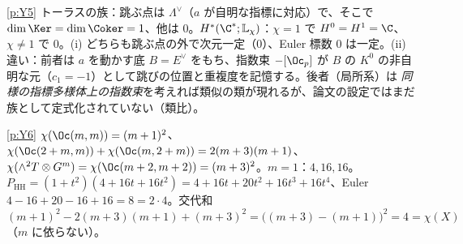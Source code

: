 \begin{sol}{\ref{p:Y5}}
トーラスの族：跳ぶ点は $\Lambda^\vee$（$a$ が自明な指標に対応）で、そこで $\dim\Ker=\dim\Coker=1$、他は $0$。$H^*(\C^*;\mathbb L_\chi)$：$\chi=1$ で $H^0=H^1=\C$、$\chi\ne1$ で $0$。(i) どちらも跳ぶ点の外で次元一定（$0$）、Euler 標数 $0$ は一定。(ii) 違い：前者は $a$ を動かす底 $B=E^\vee$ をもち、指数束 $-[\Oc_p]$ が $B$ の $K^0$ の非自明な元（$c_1=-1$）として跳びの位置と重複度を記憶する。後者（局所系）は \emph{同様の指標多様体上の指数束}を考えれば類似の類が現れるが、論文の設定ではまだ族として定式化されていない（類比）。
\end{sol}
\begin{sol}{\ref{p:Y6}}
$\chi(\Oc(m,m))=(m+1)^2$、$\chi(\Oc(2+m,m))+\chi(\Oc(m,2+m))=2(m+3)(m+1)$、$\chi(\wedge^2T\otimes G^m)=\chi(\Oc(m+2,m+2))=(m+3)^2$。$m=1$：$4,16,16$。$P_{\mathrm{HH}}=(1+t^2)(4+16t+16t^2)=4+16t+20t^2+16t^3+16t^4$、Euler $4-16+20-16+16=8=2\cdot4$。交代和 $(m+1)^2-2(m+3)(m+1)+(m+3)^2=\bigl((m+3)-(m+1)\bigr)^2=4=\chi(X)$（$m$ に依らない）。
\end{sol}
